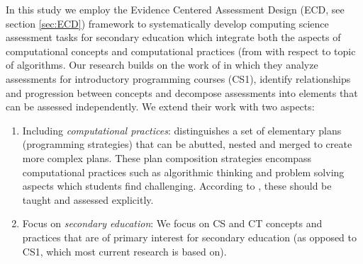 %
%
%
%
%




In this study we employ the Evidence Centered Assessment Design (ECD, see section \ref{sec:ECD}) framework to systematically develop computing science assessment tasks for secondary education which integrate both the aspects of computational concepts and computational practices (from  with respect to topic of algorithms. Our research builds on the work of  in which they analyze assessments for introductory programming courses (CS1), identify relationships and progression between concepts and decompose assessments into elements that can be assessed independently. We extend their work with two aspects:
\begin{enumerate}
\item Including \emph{computational practices}:  distinguishes a set of elementary plans (programming strategies) that can be abutted, nested and merged to create more complex plans. These plan composition strategies encompass computational practices such as algorithmic thinking and problem solving aspects which students find challenging. According to \citeauthor{deRaadt2009teachingPlans}, these should be taught and assessed explicitly.


\item Focus on \emph{secondary education}: We focus on CS and CT concepts and practices that are of primary interest for secondary education (as opposed to CS1, which most current research is based on).

\end{enumerate}

